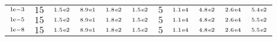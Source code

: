 \begin{tiny}
\begin{tabular}{@{$\;$}c@{$\;$}|@{$\;$}c@{$\;$}@{$\;$}c@{$\;$}@{$\;$}c@{$\;$}@{$\;$}c@{$\;$}@{$\;$}c@{$\;$}|@{$\;$}c@{$\;$}@{$\;$}c@{$\;$}@{$\;$}c@{$\;$}@{$\;$}c@{$\;$}@{$\;$}c@{$\;$}}
$\scriptstyle1\!\mathrm{\hspace{0.10em}e}-3$ & $\scriptstyle15$ & $\scriptstyle1.5\mathrm{\hspace{0.10em}e}2$ & $\scriptstyle8.9\mathrm{\hspace{0.10em}e}1$ & $\scriptstyle1.8\mathrm{\hspace{0.10em}e}2$ & $\scriptstyle1.5\mathrm{\hspace{0.10em}e}2$ & $\scriptstyle5$ & $\scriptstyle1.1\mathrm{\hspace{0.10em}e}4$ & $\scriptstyle4.8\mathrm{\hspace{0.10em}e}2$ & $\scriptstyle2.6\mathrm{\hspace{0.10em}e}4$ & $\scriptstyle5.4\mathrm{\hspace{0.10em}e}2$\\ 
$\scriptstyle1\!\mathrm{\hspace{0.10em}e}-5$ & $\scriptstyle15$ & $\scriptstyle1.5\mathrm{\hspace{0.10em}e}2$ & $\scriptstyle8.9\mathrm{\hspace{0.10em}e}1$ & $\scriptstyle1.8\mathrm{\hspace{0.10em}e}2$ & $\scriptstyle1.5\mathrm{\hspace{0.10em}e}2$ & $\scriptstyle5$ & $\scriptstyle1.1\mathrm{\hspace{0.10em}e}4$ & $\scriptstyle4.8\mathrm{\hspace{0.10em}e}2$ & $\scriptstyle2.6\mathrm{\hspace{0.10em}e}4$ & $\scriptstyle5.5\mathrm{\hspace{0.10em}e}2$\\ 
$\scriptstyle1\!\mathrm{\hspace{0.10em}e}-8$ & $\scriptstyle15$ & $\scriptstyle1.5\mathrm{\hspace{0.10em}e}2$ & $\scriptstyle8.9\mathrm{\hspace{0.10em}e}1$ & $\scriptstyle1.8\mathrm{\hspace{0.10em}e}2$ & $\scriptstyle1.5\mathrm{\hspace{0.10em}e}2$ & $\scriptstyle5$ & $\scriptstyle1.1\mathrm{\hspace{0.10em}e}4$ & $\scriptstyle4.8\mathrm{\hspace{0.10em}e}2$ & $\scriptstyle2.6\mathrm{\hspace{0.10em}e}4$ & $\scriptstyle5.5\mathrm{\hspace{0.10em}e}2$\\ 
\end{tabular} 
\end{tiny} 
